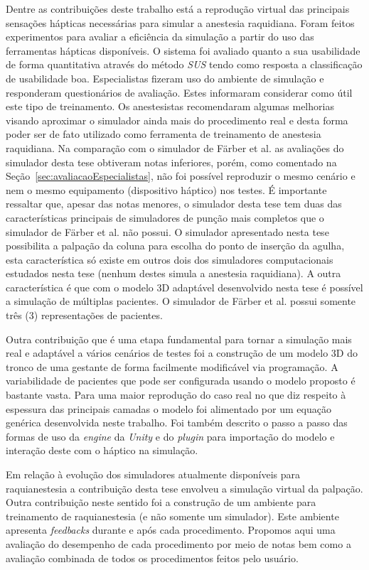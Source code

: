 Dentre as contribuições deste trabalho está a reprodução virtual das principais sensações hápticas necessárias para simular a anestesia raquidiana. Foram feitos experimentos para avaliar a eficiência da simulação a partir do uso das ferramentas hápticas disponíveis. O sistema foi avaliado quanto a sua usabilidade de forma quantitativa através do método \textit{\acrshort{SUS}} \cite{Brooke2013} tendo como resposta a classificação de usabilidade boa. Especialistas fizeram uso do ambiente de simulação e responderam questionários de avaliação. Estes informaram considerar como útil este tipo de treinamento. Os anestesistas recomendaram algumas melhorias visando aproximar o simulador ainda mais do procedimento real e desta forma poder ser de fato utilizado como ferramenta de treinamento de anestesia raquidiana. Na comparação com o simulador de Färber et al. \cite{Farber2008} as avaliações do simulador desta tese obtiveram notas inferiores, porém, como comentado na Seção~\ref{sec:avaliacaoEspecialistas}, não foi possível reproduzir o mesmo cenário e nem o mesmo equipamento (dispositivo háptico) nos testes. É importante ressaltar que, apesar das notas menores, o simulador desta tese tem duas das características principais de simuladores de punção mais completos que o simulador de Färber et al. \cite{Farber2008} não possui. O simulador apresentado nesta tese possibilita a palpação da coluna para escolha do ponto de inserção da agulha, esta característica só existe em outros dois dos simuladores computacionais estudados nesta tese (nenhum destes simula a anestesia raquidiana). A outra característica é que com o modelo 3D adaptável desenvolvido nesta tese é possível a simulação de múltiplas pacientes. O simulador de Färber et al. \cite{Farber2008} possui somente três (3) representações de pacientes.

Outra contribuição que é uma etapa fundamental para tornar a simulação mais real e adaptável a vários cenários de testes foi a construção de um modelo 3D do tronco de uma gestante de forma facilmente modificável via programação. A variabilidade de pacientes que pode ser configurada usando o modelo proposto é bastante vasta. Para uma maior reprodução do caso real no que diz respeito à espessura das principais camadas o modelo foi alimentado por um equação genérica desenvolvida neste trabalho. Foi também descrito o passo a passo das formas de uso da \textit{engine} da \textit{Unity} e do \textit{plugin} para importação do modelo e interação deste com o háptico na simulação. 

Em relação à evolução dos simuladores atualmente disponíveis para raquianestesia a contribuição desta tese envolveu a simulação virtual da palpação. Outra contribuição neste sentido foi a construção de um ambiente para treinamento de raquianestesia (e não somente um simulador). Este ambiente apresenta \textit{feedbacks} durante e após cada procedimento. Propomos aqui uma avaliação do desempenho de cada procedimento por meio de notas bem como a avaliação combinada de todos os procedimentos feitos pelo usuário. 


